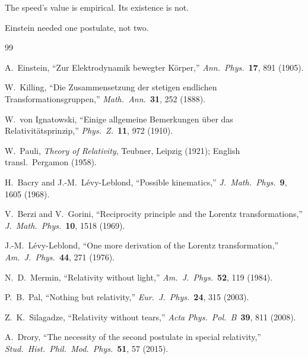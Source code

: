 \documentclass[11pt]{article}
\begin{document}
The speed's value is empirical. Its existence is not.

Einstein needed one postulate, not two.


\begin{thebibliography}{99}
\small

A.~Einstein,
``Zur Elektrodynamik bewegter K\"orper,''
\textit{Ann.\ Phys.}\ \textbf{17}, 891 (1905).

W.~Killing,
``Die Zusammensetzung der stetigen endlichen Transformationsgruppen,''
\textit{Math.\ Ann.}\ \textbf{31}, 252 (1888).

W.~von Ignatowski,
``Einige allgemeine Bemerkungen \"uber das Relativit\"atsprinzip,''
\textit{Phys.\ Z.}\ \textbf{11}, 972 (1910).

W.~Pauli,
\textit{Theory of Relativity},
Teubner, Leipzig (1921); English transl.\ Pergamon (1958).

H.~Bacry and J.-M.~L\'evy-Leblond,
``Possible kinematics,''
\textit{J.\ Math.\ Phys.}\ \textbf{9}, 1605 (1968).

V.~Berzi and V.~Gorini,
``Reciprocity principle and the Lorentz transformations,''
\textit{J.\ Math.\ Phys.}\ \textbf{10}, 1518 (1969).

J.-M.~L\'evy-Leblond,
``One more derivation of the Lorentz transformation,''
\textit{Am.\ J.\ Phys.}\ \textbf{44}, 271 (1976).

N.~D.~Mermin,
``Relativity without light,''
\textit{Am.\ J.\ Phys.}\ \textbf{52}, 119 (1984).

P.~B.~Pal,
``Nothing but relativity,''
\textit{Eur.\ J.\ Phys.}\ \textbf{24}, 315 (2003).

Z.~K.~Silagadze,
``Relativity without tears,''
\textit{Acta Phys.\ Pol.\ B}\ \textbf{39}, 811 (2008).

A.~Drory,
``The necessity of the second postulate in special relativity,''
\textit{Stud.\ Hist.\ Phil.\ Mod.\ Phys.}\ \textbf{51}, 57 (2015).

\end{thebibliography}
\end{document}
